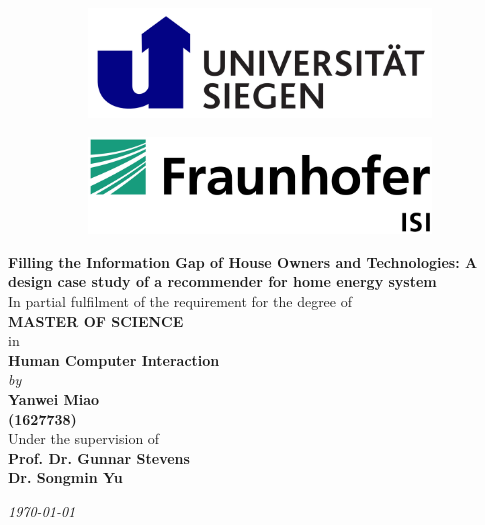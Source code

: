 \begin{titlepage}

\begin{center}

\vspace*{-1cm}

\begin{figure}[h]
  \begin{subfigure}{0.50\textwidth}
    \includegraphics[width=0.8\linewidth, left]{Images/siegen.png}
  \end{subfigure}
  \begin{subfigure}{0.49\textwidth}
    \includegraphics[width=0.8\linewidth, right]{Images/isi.jpeg}
  \end{subfigure}
\end{figure}

\vfill

{\Large \bf Filling the Information Gap of House Owners and Technologies: A design case study of a recommender for home energy system} \\

\vfill
In partial fulfilment of the requirement for the degree of\\
{\large \bf MASTER OF SCIENCE}\\
in\\ 
{\large \bf Human Computer Interaction } \\
{\em by} \\
{\large \bf Yanwei Miao} \\
{\large \bf (1627738)}\\

Under the supervision of \\
{\bf \large Prof. Dr. Gunnar Stevens} \\
{\bf \large Dr. Songmin Yu} \\

\vfill

{\it \large \today}

\end{center}

\end{titlepage}

\clearpage